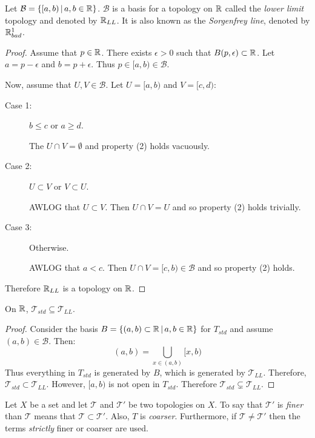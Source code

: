 \documentclass[letterpaper,12pt,fleqn]{article}
\newcommand{\T}{\mathscr{T}}
\newcommand{\B}{\mathcal{B}}
\newcommand{\e}{\epsilon}
\begin{document}
\begin{theorem}
  Let \(\B=\setb{[a,b)}{a,b\in\R}\).  \(\B\) is a basis for a topology on \(\mathbb{R}\) called the \emph{lower limit}
    topology and denoted by \(\mathbb{R}_{LL}\).  It is also known as the \emph{Sorgenfrey line}, denoted by
    \(\mathbb{R}_{bad}^1\).
\end{theorem}

\begin{proof}
  Assume that \(p\in\mathbb{R}\).  There exists \(\e>0\) such that \(B(p,\e)\subset\R\).  Let \(a=p-\e\) and \(b=p+\e\).
  Thus \(p\in[a,b)\in\B\).

  Now, assume that \(U,V\in\B\).  Let \(U=[a,b)\) and \(V=[c,d)\):
  \begin{description}
  \item[Case 1:] \(b\le c\) or \(a\ge d\).

    The \(U\cap V=\emptyset\) and property (2) holds vacuously.

  \item[Case 2:] \(U\subset V\) or \(V\subset U\).

    AWLOG that \(U\subset V\).  Then \(U\cap V=U\) and so property (2) holds trivially.

  \item[Case 3:] Otherwise.

    AWLOG that \(a<c\).  Then \(U\cap V=[c,b)\in\B\) and so property (2) holds.
  \end{description}

  Therefore \(\mathbb{R}_{LL}\) is a topology on \(\mathbb{R}\).
\end{proof}

\begin{theorem}
  On \(\mathbb{R}\), \(\T_{std}\subseteq\T_{LL}\).
\end{theorem}

\begin{proof}
  Consider the basis \(B=\left\{{(a,b)\subset\mathbb{R}}\,\middle|\,{a,b\in\mathbb{R}}\right\}\) for \(T_{std}\) and assume \((a,b)\in\B\). Then:
  \[(a,b)=\bigcup_{x\in(a,b)}[x,b)\]
  Thus everything in \(T_{std}\) is generated by \(B\), which is generated by \(\T_{LL}\).  Therefore,
  \(\T_{std}\subset\T_{LL}\).  However, \([a,b)\) is not open in \(T_{std}\).  Therefore
  \(\T_{std}\subsetneq\T_{LL}\).
\end{proof}

\begin{definition}[Finer]
  Let \(X\) be a set and let \(\T\) and \(\T'\) be two topologies on \(X\).  To say that \(\T'\) is \emph{finer}
  than \(\T\) means that \(\T\subset\T'\).  Also, \(T\) is \emph{coarser}.  Furthermore, if \(\T\ne\T'\) then the
  terms \emph{strictly} finer or coarser are used.
\end{definition}
\end{document}

